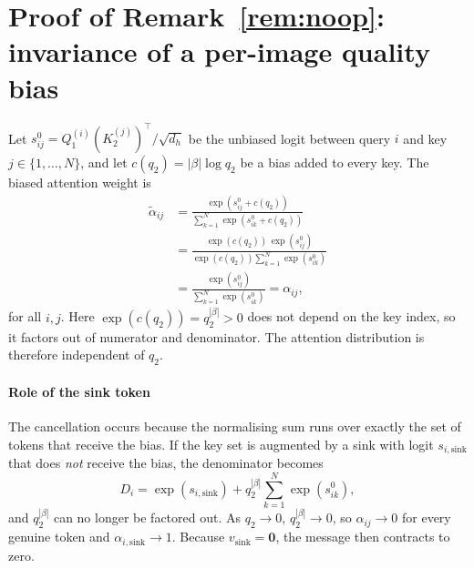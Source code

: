 \documentclass[final,5p,times,twocolumn,authoryear]{elsarticle}
\theoremstyle{plain}
\theoremstyle{remark}
\begin{document}
\section{\texorpdfstring{Proof of Remark~\ref{rem:noop}: invariance of a per-image quality bias}{Proof of the softmax invariance of a per-image quality bias}}
\label{app:noopproof}

Let $s^{0}_{ij} = Q_1^{(i)} (K_2^{(j)})^\top/\sqrt{d_h}$ be the unbiased logit between query $i$ and key $j\in\{1,\dots,N\}$, and let $c(q_2) = |\beta|\log q_2$ be a bias added to every key. The biased attention weight is
\begin{equation}
\begin{split}
  \tilde{\alpha}_{ij} &= \frac{\exp(s^{0}_{ij} + c(q_2))}{\sum_{k=1}^N \exp(s^{0}_{ik} + c(q_2))} \\
  &= \frac{\exp(c(q_2))\,\exp(s^{0}_{ij})}{\exp(c(q_2))\sum_{k=1}^N \exp(s^{0}_{ik})} \\
  &= \frac{\exp(s^{0}_{ij})}{\sum_{k=1}^N \exp(s^{0}_{ik})} = \alpha_{ij},
\end{split}
\end{equation}
for all $i,j$. Here $\exp(c(q_2)) = q_2^{|\beta|}>0$ does not depend on the key index, so it factors out of numerator and denominator. The attention distribution is therefore independent of $q_2$.

\paragraph{Role of the sink token} The cancellation occurs because the normalising sum runs over exactly the set of tokens that receive the bias. If the key set is augmented by a sink with logit $s_{i,\text{sink}}$ that does \emph{not} receive the bias, the denominator becomes
\begin{equation}
  D_i = \exp(s_{i,\text{sink}}) + q_2^{|\beta|} \sum_{k=1}^N \exp(s^{0}_{ik}),
\end{equation}
and $q_2^{|\beta|}$ can no longer be factored out. As $q_2 \to 0$, $q_2^{|\beta|} \to 0$, so $\alpha_{ij} \to 0$ for every genuine token and $\alpha_{i,\text{sink}} \to 1$. Because $v_{\text{sink}} = \mathbf{0}$, the message then contracts to zero.

\end{document}
